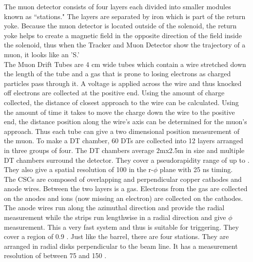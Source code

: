 	The muon detector consists of four layers each divided into smaller modules known as ``stations." The layers are separated by iron which is part of the return yoke. Because the muon detector is located outside of the solenoid, the return yoke helps to create a magnetic field in the opposite direction of the field inside the solenoid, thus when the Tracker and Muon Detector show the trajectory of a muon, it looks like an 'S.'\\
	
	The Muon Drift Tubes are 4 cm wide tubes which contain a wire stretched down the length of the tube and a gas that is prone to losing electrons as charged particles pass through it. A voltage is applied across the wire and thus knocked off electrons are collected at the positive end. Using the amount of charge collected, the distance of closest approach to the wire can be calculated. Using the amount of time it takes to move the charge down the wire to the positive end, the distance position along the wire's axis can be determined for the muon's approach. Thus each tube can give a two dimensional position measurement of the muon. To make a DT chamber, 60 DTs are collected into 12 layers arranged in three groups of four. The DT chambers average 2mx2.5m in size and multiple DT chambers surround the detector. They cover a pseudorapidity range of up to \abseta {}. They also give a spatial resolution of 100 \um in the r-$\phi$ plane with 25 ns timing.\\
	
	The CSCs are composed of overlapping and perpendicular copper cathodes and anode wires. Between the two layers is a gas. Electrons from the gas are collected on the anodes and ions (now missing an electron) are collected on the cathodes. The anode wires run along the azimuthal direction and provide the radial measurement while the strips run lengthwise in a radial direction and give  $\phi$ measurement. This a very fast system and thus is suitable for triggering. They cover a region of 0.9 \lt \abseta {}. Just like the barrel, there are four stations. They are arranged in radial disks perpendicular to the beam line. It has a measurement resolution of between 75 and 150 \um.\\
	
